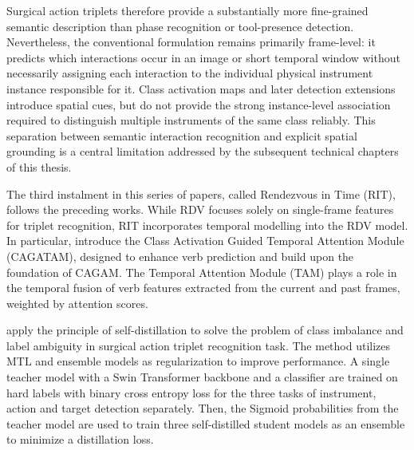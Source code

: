 Surgical action triplets therefore provide a substantially more fine-grained semantic description than phase recognition or tool-presence detection. Nevertheless, the conventional formulation remains primarily frame-level: it predicts which interactions occur in an image or short temporal window without necessarily assigning each interaction to the individual physical instrument instance responsible for it. Class activation maps and later detection extensions introduce spatial cues, but do not provide the strong instance-level association required to distinguish multiple instruments of the same class reliably. This separation between semantic interaction recognition and explicit spatial grounding is a central limitation addressed by the subsequent technical chapters of this thesis.


The third instalment in this series of papers, \citet{sharma2022RendezvousInTime} called Rendezvous in Time (RIT), follows the preceding works. While RDV focuses solely on single-frame features for triplet recognition, RIT incorporates temporal modelling into the RDV model.
In particular, \citet{sharma2022RendezvousInTime} introduce the Class Activation Guided Temporal Attention Module (CAGATAM), designed to enhance verb prediction and build upon the foundation of CAGAM. The Temporal Attention Module (TAM) plays a role in the temporal fusion of verb features extracted from the current and past frames, weighted by attention scores.

\citet{multi_self_distillation} apply the principle of self-distillation to solve the problem of class imbalance and label ambiguity in surgical action triplet recognition task. The method utilizes MTL and ensemble models as regularization to improve performance. A single teacher model with a Swin Transformer \citep{liu2021Swin} backbone and a classifier are trained on hard labels with binary cross entropy loss for the three tasks of instrument, action and target detection separately. Then, the Sigmoid probabilities from the teacher model are used to train three self-distilled student models as an ensemble to minimize a distillation loss.      

